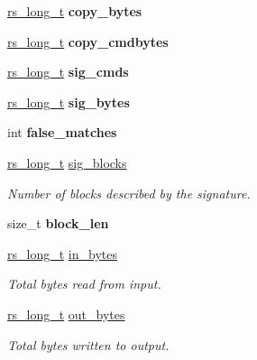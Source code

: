 \begin{CompactItemize}
\item 
\hypertarget{structrs__stats_9b21056da59babbb2821136da124062d}{
\hyperlink{librsync-config_8h_6edddd44ca74c10ea65ef82d116e0ffa}{rs\_\-long\_\-t} \textbf{copy\_\-bytes}}
\label{structrs__stats_9b21056da59babbb2821136da124062d}

\item 
\hypertarget{structrs__stats_dff5dde5dffc6a43920ca6c7efb28ab7}{
\hyperlink{librsync-config_8h_6edddd44ca74c10ea65ef82d116e0ffa}{rs\_\-long\_\-t} \textbf{copy\_\-cmdbytes}}
\label{structrs__stats_dff5dde5dffc6a43920ca6c7efb28ab7}

\item 
\hypertarget{structrs__stats_e0089977b2e626379ace74995402f771}{
\hyperlink{librsync-config_8h_6edddd44ca74c10ea65ef82d116e0ffa}{rs\_\-long\_\-t} \textbf{sig\_\-cmds}}
\label{structrs__stats_e0089977b2e626379ace74995402f771}

\item 
\hypertarget{structrs__stats_cc808480deca2206d1e619ae1915a3a2}{
\hyperlink{librsync-config_8h_6edddd44ca74c10ea65ef82d116e0ffa}{rs\_\-long\_\-t} \textbf{sig\_\-bytes}}
\label{structrs__stats_cc808480deca2206d1e619ae1915a3a2}

\item 
\hypertarget{structrs__stats_6c77fd7f630fcd027c80a73cfb8a1d8c}{
int \textbf{false\_\-matches}}
\label{structrs__stats_6c77fd7f630fcd027c80a73cfb8a1d8c}

\item 
\hyperlink{librsync-config_8h_6edddd44ca74c10ea65ef82d116e0ffa}{rs\_\-long\_\-t} \hyperlink{structrs__stats_cacc5f67f9babdefed46bf12473c985f}{sig\_\-blocks}
\begin{CompactList}\small\item\em Number of blocks described by the signature. \item\end{CompactList}\item 
\hypertarget{structrs__stats_c55f8f367cb710aeb7bb890460b7b91c}{
size\_\-t \textbf{block\_\-len}}
\label{structrs__stats_c55f8f367cb710aeb7bb890460b7b91c}

\item 
\hyperlink{librsync-config_8h_6edddd44ca74c10ea65ef82d116e0ffa}{rs\_\-long\_\-t} \hyperlink{structrs__stats_fc6c46001cdce8922e443946c4151051}{in\_\-bytes}
\begin{CompactList}\small\item\em Total bytes read from input. \item\end{CompactList}\item 
\hyperlink{librsync-config_8h_6edddd44ca74c10ea65ef82d116e0ffa}{rs\_\-long\_\-t} \hyperlink{structrs__stats_ce1905d4a0a8d1dfd76a94051afbe571}{out\_\-bytes}
\begin{CompactList}\small\item\em Total bytes written to output. \item\end{CompactList}\end{CompactItemize}


